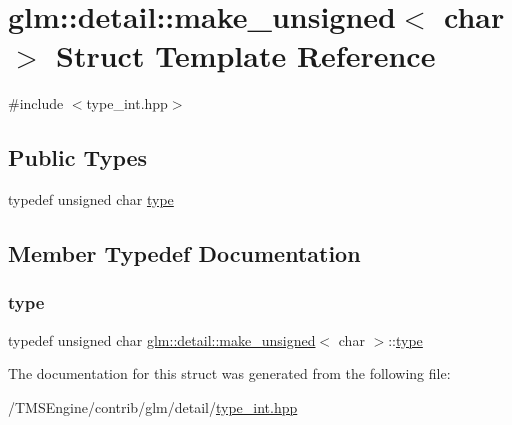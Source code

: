 \hypertarget{structglm_1_1detail_1_1make__unsigned_3_01char_01_4}{}\section{glm\+:\+:detail\+:\+:make\+\_\+unsigned$<$ char $>$ Struct Template Reference}
\label{structglm_1_1detail_1_1make__unsigned_3_01char_01_4}


{\ttfamily \#include $<$type\+\_\+int.\+hpp$>$}

\subsection*{Public Types}
\begin{DoxyCompactItemize}
\item 
typedef unsigned char \hyperlink{structglm_1_1detail_1_1make__unsigned_3_01char_01_4_a473f89289be25f14bdc7c459e4be4fed}{type}
\end{DoxyCompactItemize}


\subsection{Member Typedef Documentation}
\mbox{\label{structglm_1_1detail_1_1make__unsigned_3_01char_01_4_a473f89289be25f14bdc7c459e4be4fed}} 
\subsubsection{\texorpdfstring{type}{type}}
{\footnotesize\ttfamily typedef unsigned char \hyperlink{structglm_1_1detail_1_1make__unsigned}{glm\+::detail\+::make\+\_\+unsigned}$<$ char $>$\+::\hyperlink{structglm_1_1detail_1_1make__unsigned_3_01char_01_4_a473f89289be25f14bdc7c459e4be4fed}{type}}



The documentation for this struct was generated from the following file\+:\begin{DoxyCompactItemize}
\item 
/\+T\+M\+S\+Engine/contrib/glm/detail/\hyperlink{type__int_8hpp}{type\+\_\+int.\+hpp}\end{DoxyCompactItemize}
